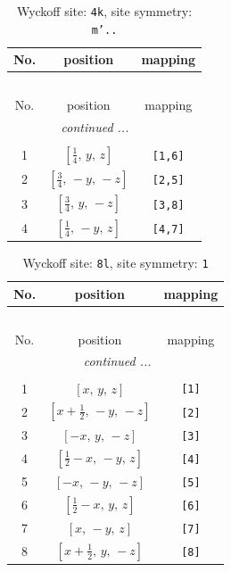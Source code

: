 \documentclass[fleqn,8pt]{jsarticle}
\begin{document}
\renewcommand{\arraystretch}{1.2}
\begin{longtable}{ccc}
\caption{Wyckoff site: {\tt 4k}, site symmetry: {\tt m'..}}
 \\
 \hline \hline
No. & position & mapping \\ \hline \endfirsthead

\multicolumn{2}{l}{\tablename\ \thetable{}} \\
 \hline \hline
No. & position & mapping \\ \hline \endhead

 \hline \hline
\multicolumn{2}{r}{\footnotesize\it continued ...} \\ \endfoot

 \hline \hline
\multicolumn{2}{r}{} \\ \endlastfoot

1 & $\left[ \frac{1}{4},\, y,\, z \right]$ & {\tt [1,6]} \\ \hline
2 & $\left[ \frac{3}{4},\, - y,\, - z \right]$ & {\tt [2,5]} \\ \hline
3 & $\left[ \frac{3}{4},\, y,\, - z \right]$ & {\tt [3,8]} \\ \hline
4 & $\left[ \frac{1}{4},\, - y,\, z \right]$ & {\tt [4,7]} \\
\end{longtable}
\renewcommand{\arraystretch}{1.2}
\begin{longtable}{ccc}
\caption{Wyckoff site: {\tt 8l}, site symmetry: {\tt 1}}
 \\
 \hline \hline
No. & position & mapping \\ \hline \endfirsthead

\multicolumn{2}{l}{\tablename\ \thetable{}} \\
 \hline \hline
No. & position & mapping \\ \hline \endhead

 \hline \hline
\multicolumn{2}{r}{\footnotesize\it continued ...} \\ \endfoot

 \hline \hline
\multicolumn{2}{r}{} \\ \endlastfoot

1 & $\left[ x,\, y,\, z \right]$ & {\tt [1]} \\ \hline
2 & $\left[ x + \frac{1}{2},\, - y,\, - z \right]$ & {\tt [2]} \\ \hline
3 & $\left[ - x,\, y,\, - z \right]$ & {\tt [3]} \\ \hline
4 & $\left[ \frac{1}{2} - x,\, - y,\, z \right]$ & {\tt [4]} \\ \hline
5 & $\left[ - x,\, - y,\, - z \right]$ & {\tt [5]} \\ \hline
6 & $\left[ \frac{1}{2} - x,\, y,\, z \right]$ & {\tt [6]} \\ \hline
7 & $\left[ x,\, - y,\, z \right]$ & {\tt [7]} \\ \hline
8 & $\left[ x + \frac{1}{2},\, y,\, - z \right]$ & {\tt [8]} \\
\end{longtable}
\end{document}
